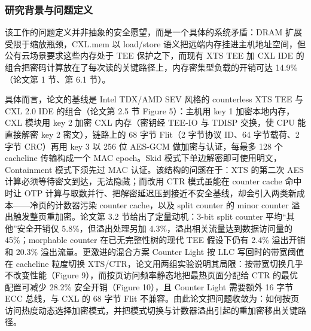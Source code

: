 \documentclass[11pt]{ctexart}
\begin{document}
\subsubsection{研究背景与问题定义}
该工作的问题定义并非抽象的安全愿望，而是一个具体的系统矛盾：DRAM 扩展受限于缩放瓶颈，CXL.mem 以 load/store 语义把远端内存挂进主机地址空间，但公有云场景要求这些内存处于 TEE 保护之下，而现有 XTS TEE 加 CXL IDE 的组合把密码计算放在了每次读的关键路径上，内存密集型负载的开销可达 14.9\%（论文第 1 节、第 6.1 节）。\par
具体而言，论文的基线是 Intel TDX/AMD SEV 风格的 counterless XTS TEE 与 CXL 2.0 IDE 的组合（论文第 2.5 节 Figure 5）：主机用 key 1 加密本地内存，CXL 模块用 key 2 加密 CXL 内存（密钥经 TEE-IO 与 TDISP 交换，使 CPU 能直接解密 key 2 密文），链路上的 68 字节 Flit（2 字节协议 ID、64 字节载荷、2 字节 CRC）再用 key 3 以 256 位 AES-GCM 做加密与认证，每最多 128 个 cacheline 传输构成一个 MAC epoch。Skid 模式下单边解密即可使用明文，Containment 模式下须先过 MAC 认证。该结构的问题在于：XTS 的第二次 AES 计算必须等待密文到达，无法隐藏；而改用 CTR 模式虽能在 counter cache 命中时让 OTP 计算与取数并行、把解密延迟压到接近不安全基线，却会引入两类新成本——冷页的计数器污染 counter cache，以及 split counter 的 minor counter 溢出触发整页重加密。论文第 3.2 节给出了定量动机：3-bit split counter 平均“其他”安全开销仅 5.8\%，但溢出处理另加 4.3\%，溢出相关流量达到数据访问量的 45\%；morphable counter 在已无完整性树的现代 TEE 假设下仍有 2.4\% 溢出开销和 20.3\% 溢出流量。更激进的混合方案 Counter Light 按 LLC 写回时的带宽阈值在 cacheline 粒度切换 XTS/CTR，论文用两组实验说明其局限：按带宽切换几乎不改变性能（Figure 9），而按页访问频率静态地把最热页面分配给 CTR 的最优配置可减少 28.2\% 安全开销（Figure 10），且 Counter Light 需要额外 16 字节 ECC 总线，与 CXL 的 68 字节 Flit 不兼容。由此论文把问题收敛为：如何按页访问热度动态选择加密模式，并把模式切换与计数器溢出引起的重加密移出关键路径。\par
\end{document}

